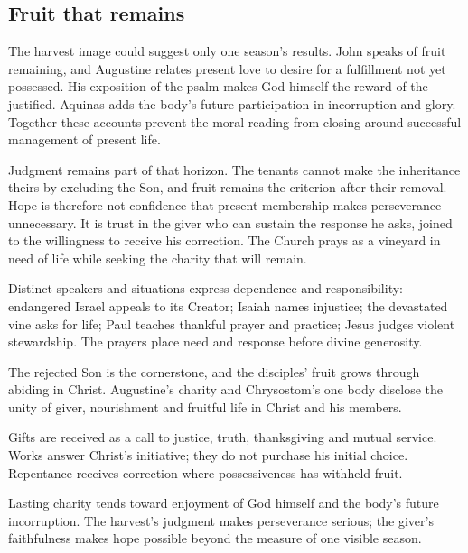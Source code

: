 \subsection{Fruit that remains}
The harvest image could suggest only one season's results. John speaks of fruit remaining, and Augustine relates present love to desire for a fulfillment not yet possessed. His exposition of the psalm makes God himself the reward of the justified. Aquinas adds the body's future participation in incorruption and glory. Together these accounts prevent the moral reading from closing around successful management of present life.

Judgment remains part of that horizon. The tenants cannot make the inheritance theirs by excluding the Son, and fruit remains the criterion after their removal. Hope is therefore not confidence that present membership makes perseverance unnecessary. It is trust in the giver who can sustain the response he asks, joined to the willingness to receive his correction. The Church prays as a vineyard in need of life while seeking the charity that will remain.

\begin{fourSenses}
\item[Literal.] Distinct speakers and situations express dependence and responsibility: endangered Israel appeals to its Creator; Isaiah names injustice; the devastated vine asks for life; Paul teaches thankful prayer and practice; Jesus judges violent stewardship. The prayers place need and response before divine generosity.
\item[Allegorical.] The rejected Son is the cornerstone, and the disciples' fruit grows through abiding in Christ. Augustine's charity and Chrysostom's one body disclose the unity of giver, nourishment and fruitful life in Christ and his members.
\item[Moral.] Gifts are received as a call to justice, truth, thanksgiving and mutual service. Works answer Christ's initiative; they do not purchase his initial choice. Repentance receives correction where possessiveness has withheld fruit.
\item[Anagogical.] Lasting charity tends toward enjoyment of God himself and the body's future incorruption. The harvest's judgment makes perseverance serious; the giver's faithfulness makes hope possible beyond the measure of one visible season.
\end{fourSenses}
